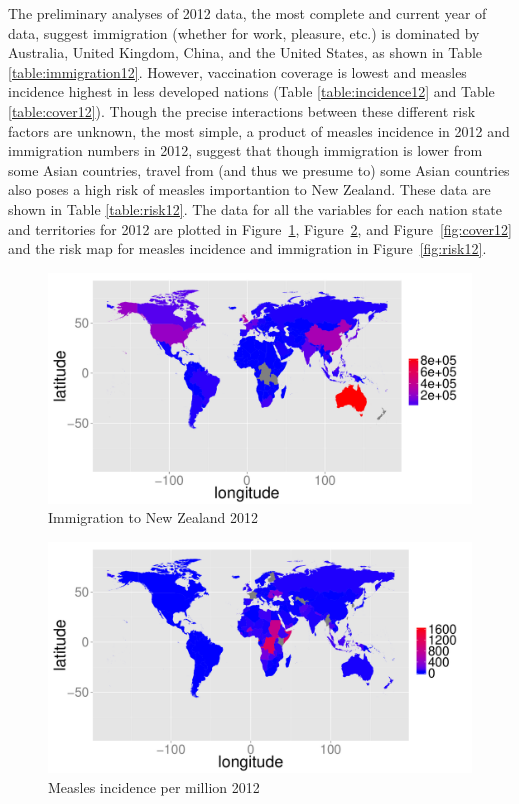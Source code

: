 \documentclass{article}
\begin{document}
The preliminary analyses of 2012 data, the most complete and current year of data, suggest immigration (whether for work, pleasure, etc.) is dominated by Australia, United Kingdom, China, and the United States, as shown in Table \ref{table:immigration12}. However, vaccination coverage is lowest and measles incidence highest in less developed nations (Table \ref{table:incidence12} and Table \ref{table:cover12}). Though the precise interactions between these different risk factors are unknown, the most simple, a product of measles incidence in 2012 and immigration numbers in 2012, suggest that though immigration is lower from some Asian countries, travel from (and thus we presume to) some Asian countries also poses a high risk of measles importantion to New Zealand. These data are shown in Table \ref{table:risk12}. The data for all the variables for each nation state and territories for 2012 are plotted in Figure~\ref{fig:immigration12}, Figure~\ref{fig:incidence12}, and Figure~\ref{fig:cover12} and the risk map for measles incidence and immigration in Figure~\ref{fig:risk12}.


\begin{figure}[h!]
\begin{center}
\includegraphics{interimreport1-007}
\end{center}
\caption{Immigration to New Zealand 2012}
\label{fig:immigration12}
\end{figure}

\begin{figure}[h!]
\begin{center}
\includegraphics{interimreport1-008}
\end{center}
\caption{Measles incidence per million 2012}
\label{fig:incidence12}
\end{figure}
\end{document}
